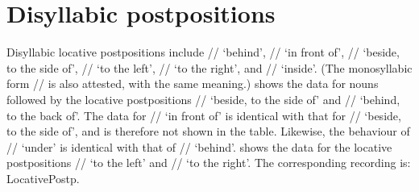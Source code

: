 
\section{Disyllabic postpositions}
\label{sec:spatialpostpositions}

Disyllabic locative postpositions include // ‘behind’,
// ‘in front of’, // ‘beside, to the side of’, // ‘to the
left’, // ‘to the right’, and // ‘inside’. (The {monosyllabic} form // is also attested, with the same meaning.)  shows the data for nouns followed by the locative postpositions // ‘beside, to
the side of’ and // ‘behind, to the back of’. The data for // ‘in front of’ is identical with that for // ‘beside, to the side of’, and is therefore not shown in the table. Likewise, the behaviour of // ‘under’ is identical with that of //
‘behind’.  shows the data for the locative postpositions // ‘to the left’ and
// ‘to the right’. The corresponding recording is: LocativePostp.


